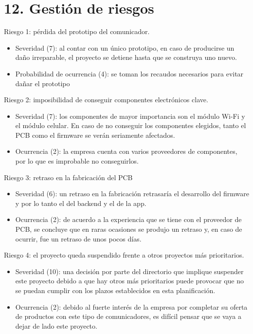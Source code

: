 \documentclass[
11pt, %
codirector, %
]{charter}
\begin{document}

\section{12. Gestión de riesgos}
\label{sec:riesgos}


Riesgo 1: pérdida del prototipo del comunicador.
\begin{itemize}
	\item Severidad (7): al contar con un único prototipo, en caso de producirse un daño irreparable, el proyecto se detiene hasta que se construya uno nuevo.
	\item Probabilidad de ocurrencia (4): se toman los recaudos necesarios para evitar dañar el prototipo
\end{itemize}   

Riesgo 2: imposibilidad de conseguir componentes electrónicos clave.
\begin{itemize}
	\item Severidad (7): los componentes de mayor importancia son el módulo Wi-Fi y el módulo celular. En caso de no conseguir los componentes elegidos, tanto el PCB como el firmware se verán seriamente afectados. 
	\item Ocurrencia (2): la empresa cuenta con varios proveedores de componentes, por lo que es improbable no conseguirlos.
\end{itemize}

Riesgo 3: retraso en la fabricación del PCB
\begin{itemize}
	\item Severidad (6): un retraso en la fabricación retrasaría el desarrollo del firmware y por lo tanto el del backend y el de la app.
	\item Ocurrencia (2): de acuerdo a la experiencia que se tiene con el proveedor de PCB, se concluye que en raras ocasiones se produjo un retraso y, en caso de ocurrir, fue un retraso de unos pocos días.
\end{itemize}

Riesgo 4: el proyecto queda suspendido frente a otros proyectos más prioritarios.
\begin{itemize}
	\item Severidad (10): una decisión por parte del directorio que implique suspender este proyecto debido a que hay otros más prioritarios puede provocar que no se puedan cumplir con los plazos establecidos en esta planificación.
	\item Ocurrencia (2): debido al fuerte interés de la empresa por completar su oferta de productos con este tipo de comunicadores, es difícil pensar que se vaya a dejar de lado este proyecto.
\end{itemize}
\end{document}
